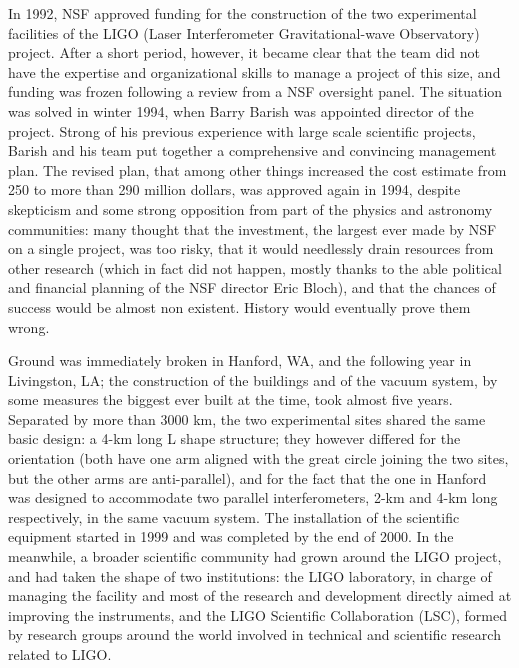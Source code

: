 In 1992, NSF approved funding for the construction of the two experimental facilities of the LIGO (Laser Interferometer Gravitational-wave Observatory) project\cite{Abramovici_1992}.
After a short period, however, it became clear that the team did not have the expertise and organizational skills to manage a project of this size, and funding was frozen following a review from a NSF oversight panel.
The situation was solved in winter 1994, when Barry Barish was appointed director of the project. Strong of his previous experience with large scale scientific projects, Barish and his team put together a comprehensive and convincing management plan.
The revised plan, that among other things increased the cost estimate from 250 to more than 290 million dollars, was approved again in 1994, despite skepticism and some strong opposition from part of the physics and astronomy communities:
many thought that the investment, the largest ever made by NSF on a  single project, was too risky, that it would needlessly drain resources from other research (which in fact did not happen, mostly thanks to the able political and financial planning of the NSF director Eric Bloch), and that the chances of success would be almost non existent.
History would eventually prove them wrong.

Ground was immediately broken in Hanford, WA, and the following year in Livingston, LA; 
the construction of the buildings and of the vacuum system, by some measures the biggest 
ever built at the time, took almost five years. Separated by more than 3000 km, the two 
experimental sites shared the same basic design: a 4-km long L shape structure; they 
however differed for the orientation (both have one arm aligned with the great circle joining the two sites, but the other arms are anti-parallel), and for the fact that the one in Hanford was 
designed to accommodate two parallel interferometers, 2-km and 4-km long respectively, in the same vacuum system. 
The installation of the scientific equipment started in 1999 and was completed by the end of 2000. 
In the meanwhile, a broader scientific community had grown around the LIGO project, 
and had taken the shape of two institutions: the LIGO laboratory, in charge of managing 
the facility and most of the research and development directly aimed at improving the 
instruments, and the LIGO Scientific Collaboration (LSC), formed by research groups 
around the world involved in technical and scientific research related to LIGO.

